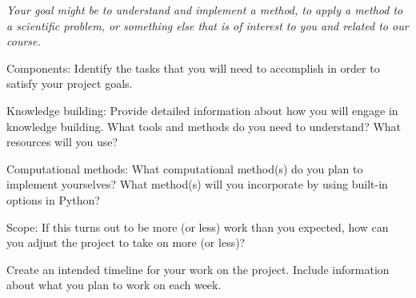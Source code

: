 \documentclass[12pt,letterpaper,noanswers]{exam}
\begin{document}
\begin{questions}
\begin{parts}
    \emph{Your goal might be to understand and implement a method, to apply a method to a scientific problem, or something else that is of interest to you and related to our course.}
    \item Components: Identify the tasks that you will need to accomplish in order to satisfy your project goals.
    \item Knowledge building: Provide detailed information about how you will engage in knowledge building.  What tools and methods do you need to understand?  What resources will you use?
    \item Computational methods: What computational method(s) do you plan to implement yourselves?  What method(s) will you incorporate by using built-in options in Python?
    \item Scope: If this turns out to be more (or less) work than you expected, how can you adjust the project to take on more (or less)?
    \item Create an intended timeline for your  work on the project.  Include information about what you plan to work on each week.

\end{parts}











\end{questions}
\end{document}
